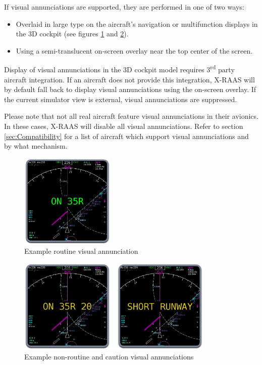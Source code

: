 \documentclass[a4paper,12pt]{article}
\begin{document}
If visual annunciations are supported, they are performed in one of two
ways:

\begin{itemize}

\item Overlaid in large type on the aircraft's navigation or
multifunction displays in the 3D cockpit (see figures
\ref{fig:RoutineVisual} and \ref{fig:NonroutineVisual}).

\item Using a semi-translucent on-screen overlay near the top center of
the screen.

\end{itemize}

\noindent Display of visual annunciations in the 3D cockpit model
requires 3\textsuperscript{rd} party aircraft integration. If an
aircraft does not provide this integration, X-RAAS will by default fall
back to display visual annunciations using the on-screen overlay. If the
current simulator view is external, visual annunciations are suppressed.

Please note that not all real aircraft feature visual annunciations in
their avionics. In these cases, X-RAAS will disable all visual
annunciations. Refer to section \ref{sec:Compatibility} for a
list of aircraft which support visual annunciations and by what
mechanism.

\begin{figure}[H]
\begin{center}
\includegraphics[height=4.5cm]{../src/sample_ND_routine.png}
\end{center}
\caption{Example routine visual annunciation}
\label{fig:RoutineVisual}
\end{figure}

\begin{figure}[H]
\begin{center}
\vspace{2em}
\includegraphics[height=4.5cm]{../src/sample_ND_alert.png}
\end{center}
\caption{Example non-routine and caution visual annunciations}
\label{fig:NonroutineVisual}
\end{figure}
\end{document}
